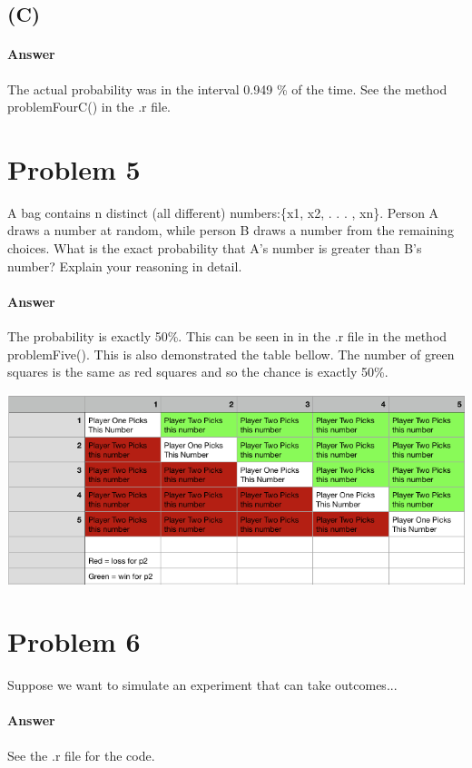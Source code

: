 \documentclass[12pt]{article}
\begin{document}
\subsection*{(C)}

\paragraph{Answer}
The actual probability was in the interval  0.949 \% of the time. See the method problemFourC() in the .r file.

\section*{Problem 5}
A bag contains n distinct (all different) numbers:\{x1, x2, . . . , xn\}.  Person A draws a number at random, while person B draws a number from the remaining choices.  What is the exact probability that A’s number is greater than B’s number?  Explain your reasoning in detail.

\paragraph{Answer}
The probability is exactly 50\%. This can be seen in in the .r file in the method problemFive(). This is also demonstrated the table bellow. The number of green squares is the same as red squares and so the chance is exactly 50\%.
\begin{center}
	\includegraphics[width=\linewidth]{p5 table.png}
\end{center}

\section*{Problem 6}
Suppose we want to simulate an experiment that can take outcomes...

\paragraph{Answer}
See the .r file for the code.
\end{document}
